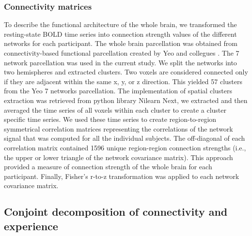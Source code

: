 \subsubsection{Connectivity matrices}

To describe the functional architecture of the whole brain, we transformed the resting-state BOLD time series into connection strength values of the different networks for each participant. The whole brain parcellation was obtained from connectivity-based functional parcellation created by Yeo and collegues \citeyear{Yeo2011}.
The 7 network parcellation was used in the current study. We split the networks into two hemispheres and extracted clusters. Two voxels are considered connected only if they are adjacent within the same x, y, or z direction. This yielded 57 clusters from the Yeo 7 networks parcellation. The implementation of spatial clusters extraction was retrieved from python library Nilearn \cite[\url{http://nilearn.github.io/}, version 0.3.1]{Abraham2014}
Next, we extracted and then averaged the time series of all voxels within each cluster to create a cluster specific time series. We used these time series to create region-to-region symmetrical correlation matrices representing the correlations of the network signal that was computed for all the individual subjects. The off-diagonal of each correlation matrix contained 1596 unique region-region connection strengths (i.e., the upper or lower triangle of the network covariance matrix). This approach provided a measure of connection strength of the whole brain for each participant. Finally, Fisher’s r-to-z transformation was applied to each network covariance matrix.

\subsection{Conjoint decomposition of connectivity and experience}
\label{study2:method:ML}

